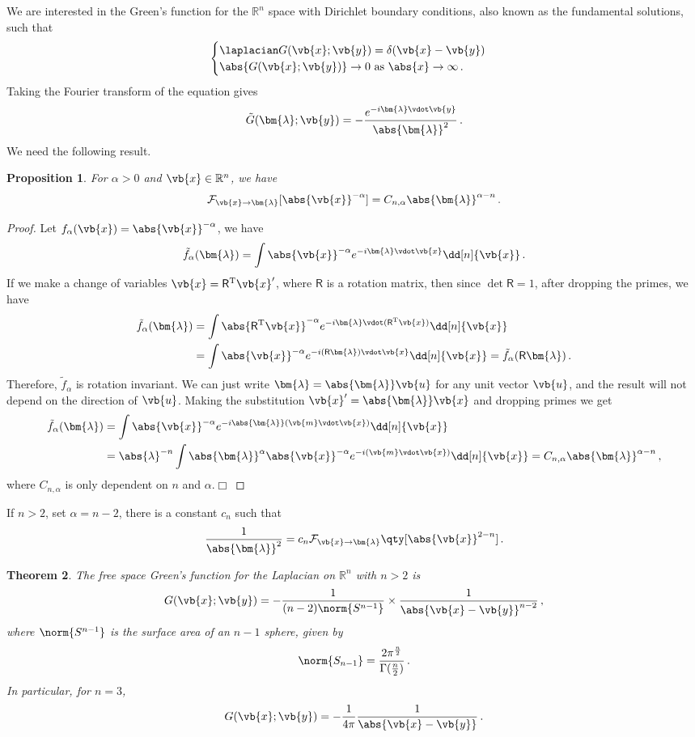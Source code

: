 \documentclass{article}
\theoremstyle{plain}\theoremheaderfont{\normalfont\itshape}\theorembodyfont{\rmfamily}\theoremseparator{.}\newtheorem*{rem}{Remark}\newtheorem*{ex}{Example}\newtheorem*{proof}{Proof}\newtheorem*{altp}{Alternative proof}
\theoremstyle{plain}\theoremheaderfont{\normalfont\bfseries}\theorembodyfont{\rmfamily}\theoremseparator{.}\newtheorem{thm}{Theorem}[section]\newtheorem{lem}[thm]{Lemma}\newtheorem{prop}[thm]{Proposition}\newtheorem*{cor}{Corollary}\newtheorem{defn}[thm]{Definition}\newtheorem{clm}[thm]{Claim}\newtheorem{clminproof}{Claim}
\theoremstyle{break}\theoremheaderfont{\normalfont\itshape}\theorembodyfont{\rmfamily}\theoremseparator{.\medskip}\newtheorem*{proofskip}{Proof}\newtheorem*{exs}{Examples}\newtheorem*{rems}{Remarks}
\theoremstyle{break}\theoremheaderfont{\normalfont\bfseries}\theorembodyfont{\rmfamily}\theoremseparator{.\medskip}\newtheorem{lemskip}[thm]{Lemma}\newtheorem{defnskip}[thm]{Definition}\newtheorem{propskip}[thm]{Proposition}\newtheorem{thmskip}[thm]{Theorem}
\numberwithin{equation}{section}
\newcommand{\qed}{\hfill\ensuremath{\Box}}
\newcommand{\bl}{\bm{\lambda}}
\newcommand{\tp}{^\mathrm{T}}
\begin{document}
	We are interested in the Green's function for the \(\mathbb{R}^n\) space with Dirichlet boundary conditions, also known as the fundamental solutions, such that
	\[\begin{cases}
		\laplacian G(\vb{x};\vb{y})=\delta(\vb{x}-\vb{y})\\
		\abs{G(\vb{x};\vb{y})}\to 0 \text{ as }\abs{x}\to\infty\,.
	\end{cases}\]
	Taking the Fourier transform of the equation gives
	\[\tilde{G}(\bl;\vb{y})=-\frac{e^{-i\bl\vdot\vb{y}}}{\abs{\bl}^2}\,.\]
	We need the following result.
	\begin{prop}
		For \(\alpha>0\) and \(\vb{x}\in\mathbb{R}^n\), we have
		\[\mathcal{F}_{\vb{x}\to\bl}[\abs{\vb{x}}^{-\alpha}]=C_{n,\alpha}\abs{\bl}^{\alpha-n}\,.\]
	\end{prop}
	\begin{proof}
		Let \(f_\alpha(\vb{x})=\abs{\vb{x}}^{-\alpha}\), we have
		\[\tilde{f}_\alpha(\bl)=\int\abs{\vb{x}}^{-\alpha}e^{-i\bl\vdot\vb{x}}\dd[n]{\vb{x}}\,.\]
		If we make a change of variables \(\vb{x}=\mathsf{R}\tp\vb{x}'\), where \(\mathsf{R}\) is a rotation matrix, then since \(\det{\mathsf{R}}=1\), after dropping the primes, we have
		\begin{align*}
			\tilde{f}_\alpha(\bl)&=\int\abs{\mathsf{R}\tp\vb{x}}^{-\alpha}e^{-i\bl\vdot(\mathsf{R}\tp\vb{x})}\dd[n]{\vb{x}}\\
			&=\int\abs{\vb{x}}^{-\alpha}e^{-i(\mathsf{R}\bl)\vdot\vb{x}}\dd[n]{\vb{x}}=\tilde{f}_\alpha(\mathsf{R}\bl)\,.
		\end{align*}
		Therefore, \(\tilde{f}_\alpha\) is rotation invariant. We can just write \(\bl=\abs{\bl}\vb{u}\) for any unit vector \(\vb{u}\), and the result will not depend on the direction of \(\vb{u}\). Making the substitution \(\vb{x}'=\abs{\bl}\vb{x}\) and dropping primes we get
		\begin{align*}
			\tilde{f}_\alpha(\bl)&=\int\abs{\vb{x}}^{-\alpha}e^{-i\abs{\bl}(\vb{m}\vdot\vb{x})}\dd[n]{\vb{x}}\\
			&=\abs{\lambda}^{-n}\int\abs{\bl}^\alpha\abs{\vb{x}}^{-\alpha}e^{-i(\vb{m}\vdot\vb{x})}\dd[n]{\vb{x}}=C_{n,\alpha}\abs{\bl}^{\alpha-n}\,,
		\end{align*}
		where \(C_{n,\alpha}\) is only dependent on \(n\) and \(\alpha\).\qed
	\end{proof}
	If \(n>2\), set \(\alpha=n-2\), there is a constant \(c_n\) such that
	\[\frac{1}{\abs{\bl}^2}=c_n\mathcal{F}_{\vb{x}\to\bl}\qty[\abs{\vb{x}}^{2-n}]\,.\]
	\begin{thm}
		The free space Green's function for the Laplacian on \(\mathbb{R}^n\) with \(n>2\) is
		\[G(\vb{x};\vb{y})=-\frac{1}{(n-2)\norm{S^{n-1}}}\times\frac{1}{\abs{\vb{x}-\vb{y}}^{n-2}}\,,\]
		where \(\norm{S^{n-1}}\) is the surface area of an \(n-1\) sphere, given by
		\[\norm{S_{n-1}}=\frac{2\pi^{\frac{n}{2}}}{\Gamma(\frac{n}{2})}\,.\]
		In particular, for \(n=3\),
		\[G(\vb{x};\vb{y})=-\frac{1}{4\pi}\frac{1}{\abs{\vb{x}-\vb{y}}}\,.\]
	\end{thm}
\end{document}
